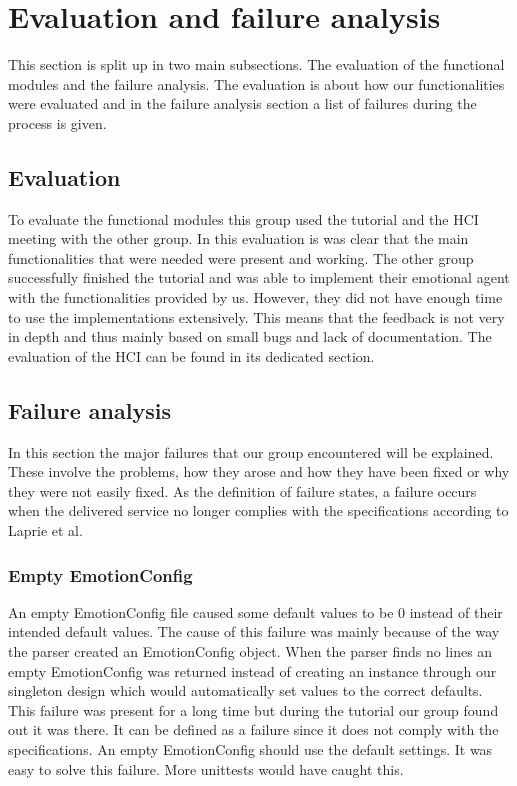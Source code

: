 \documentclass[11pt]{article}
\begin{document}
\section{Evaluation and failure analysis}
This section is split up in two main subsections. The evaluation of the functional modules and the failure analysis. The evaluation is about how our functionalities were evaluated and in the failure analysis section a list of failures during the process is given.

\subsection{Evaluation}
To evaluate the functional modules this group used the tutorial and the HCI meeting with the other group. In this evaluation is was clear that the main functionalities that were needed were present and working. The other group successfully finished the tutorial and was able to implement their emotional agent with the functionalities provided by us. However, they did not have enough time to use the implementations extensively. This means that the feedback is not very in depth and thus mainly based on small bugs and lack of documentation. The evaluation of the HCI can be found in its dedicated section.

\subsection{Failure analysis}
In this section the major failures that our group encountered will be explained. These involve the problems, how they arose and how they have been fixed or why they were not easily fixed. As the definition of failure states, a failure occurs when the delivered service no longer complies with the specifications according to Laprie et al.\cite{failure}

\subsubsection*{Empty EmotionConfig}
An empty EmotionConfig file caused some default values to be 0 instead of their intended default values. The cause of this failure was mainly because of the way the parser created an EmotionConfig object. When the parser finds no lines an empty EmotionConfig was returned instead of creating an instance through our singleton design which would automatically set values to the correct defaults. This failure was present for a long time but during the tutorial our group found out it was there. It can be defined as a failure since it does not comply with the specifications. An empty EmotionConfig should use the default settings. It was easy to solve this failure. More unittests would have caught this.
\end{document}
